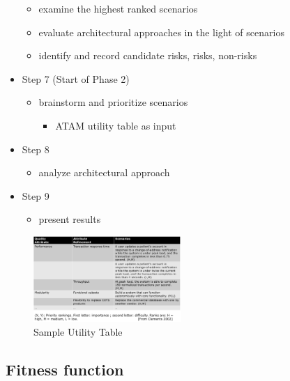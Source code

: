 \begin{itemize}
  \begin{itemize}
  \tightlist
  \item
    examine the highest ranked scenarios
  \item
    evaluate architectural approaches in the light of scenarios
  \item
    identify and record candidate risks, risks, non-risks
  \end{itemize}
\item
  Step 7 (Start of Phase 2)

  \begin{itemize}
  \tightlist
  \item
    brainstorm and prioritize scenarios

    \begin{itemize}
    \tightlist
    \item
      ATAM utility table as input
    \end{itemize}
  \end{itemize}
\item
  Step 8

  \begin{itemize}
  \tightlist
  \item
    analyze architectural approach
  \end{itemize}
\item
  Step 9

  \begin{itemize}
  \tightlist
  \item
    present results
  \end{itemize}
\end{itemize}

\begin{figure}[H]
\centering
\includegraphics[width=0.5\textwidth]{figures/ATAMUtilityTable.png}
\caption{Sample Utility Table}
\end{figure}

\hypertarget{fitness-function}{%
\subsection{Fitness function}\label{fitness-function}}

